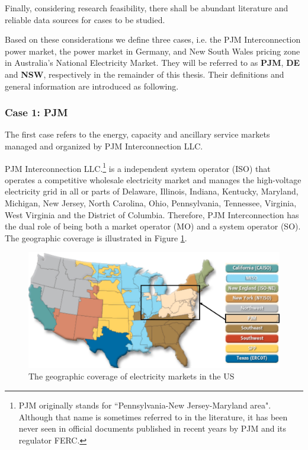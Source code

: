 Finally, considering research feasibility, there shall be abundant literature and reliable data sources for cases to be studied.

Based on these considerations we define three cases, i.e. the PJM Interconnection power market, the power market in Germany, and New South Wales pricing zone in Australia's National Electricity Market. They will be referred to as \textbf{PJM}, \textbf{DE} and \textbf{NSW}, respectively in the remainder of this thesis. Their definitions and general information are introduced as following.

\subsubsection{Case 1: PJM}

The first case refers to the energy, capacity and ancillary service markets managed and organized by PJM Interconnection LLC.

PJM Interconnection LLC.\footnote{PJM originally stands for ``Pennsylvania-New Jersey-Maryland area". Although that name is sometimes referred to in the literature, it has been never seen in official documents published in recent years by PJM and its regulator FERC.} is a independent system operator (ISO) that operates a competitive wholesale electricity market and manages the high-voltage electricity grid in all or parts of Delaware, Illinois, Indiana, Kentucky, Maryland, Michigan, New Jersey, North Carolina, Ohio, Pennsylvania, Tennessee, Virginia, West Virginia and the District of Columbia. Therefore, PJM Interconnection has the dual role of being both a market operator (MO) and a system operator (SO). The geographic coverage is illustrated in Figure \ref{fig:pjm-map}. 

\begin{figure}[h!]
	\centering
	\includegraphics[width=0.95\linewidth]{Figures/US_PowerMarkets}
	\caption{The geographic coverage of electricity markets in the US \cite{FERC_web}}
	\label{fig:pjm-map}
\end{figure}

